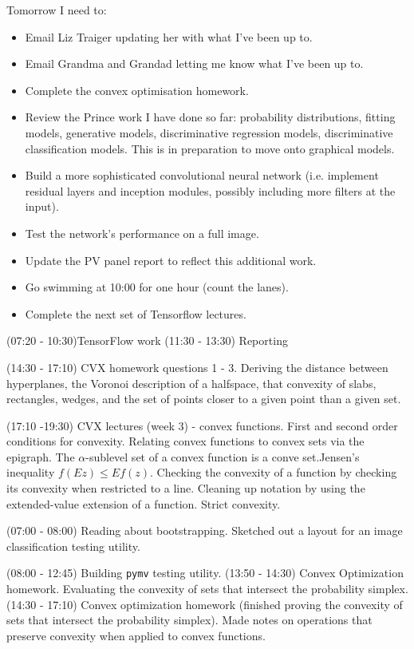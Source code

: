 \documentclass[idxtotoc,hyperref,openany]{labbook} %
\begin{document}
Tomorrow I need to:
\begin{itemize}
\item Email Liz Traiger updating her with what I've been up to.
\item Email Grandma and Grandad letting me know what I've been up to.
\item Complete the convex optimisation homework.
\item Review the Prince work I have done so far: probability distributions, fitting models, generative models, discriminative regression models, discriminative classification models. This is in preparation to move onto graphical models.
\item Build a more sophisticated convolutional neural network (i.e. implement residual layers and inception modules, possibly including more filters at the input).
\item Test the network's performance on a full image.
\item Update the PV panel report to reflect this additional work.
\item Go swimming at 10:00 for one hour (count the lanes).
\item Complete the next set of Tensorflow lectures.
\end{itemize}




(07:20 - 10:30)TensorFlow work
(11:30 - 13:30) Reporting

(14:30 - 17:10) CVX homework questions 1 - 3. Deriving the distance between hyperplanes, the Voronoi description of a halfspace, that convexity of slabs, rectangles, wedges, and the set of points closer to a given point than a given set.

(17:10 -19:30) CVX lectures (week 3) - convex functions. First and second order conditions for convexity. Relating convex functions to convex sets via the epigraph. The $\alpha$-sublevel set of a convex function is a conve set.Jensen's inequality $f(Ez) \leq Ef(z)$. Checking the convexity of a function by checking its convexity when restricted to a line. Cleaning up notation by using the extended-value extension of a function. Strict convexity.




(07:00 - 08:00) Reading about bootstrapping. Sketched out a layout for an image classification testing utility.

(08:00 - 12:45) Building \texttt{pymv} testing utility.
(13:50 - 14:30) Convex Optimization homework. Evaluating the convexity of sets that intersect the probability simplex.
(14:30 - 17:10) Convex optimization homework (finished proving the convexity of sets that intersect the probability simplex). Made notes on operations that preserve convexity when applied to convex functions.
\end{document}

